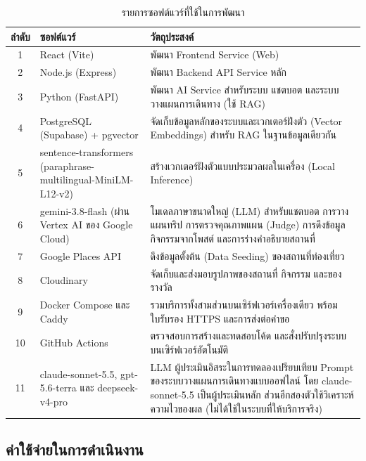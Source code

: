 \begin{table}[H]
\centering
\caption{รายการซอฟต์แวร์ที่ใช้ในการพัฒนา}
\label{tab:software}
\begin{tabular}{|c|p{4.3cm}|p{6.5cm}|}
\hline
\textbf{ลำดับ} & \textbf{ซอฟต์แวร์} & \textbf{วัตถุประสงค์} \\
\hline
1 & React (Vite) & พัฒนา Frontend Service (Web) \\ \hline
2 & Node.js (Express) & พัฒนา Backend API Service หลัก \\ \hline
3 & Python (FastAPI) & พัฒนา AI Service สำหรับระบบ แชตบอต และระบบวางแผนการเดินทาง (ใช้ RAG) \\ \hline
4 & PostgreSQL (Supabase) + pgvector & จัดเก็บข้อมูลหลักของระบบและเวกเตอร์ฝังตัว (Vector Embeddings) สำหรับ RAG ในฐานข้อมูลเดียวกัน \\ \hline
5 & sentence-transformers (paraphrase-multilingual-MiniLM-L12-v2) & สร้างเวกเตอร์ฝังตัวแบบประมวลผลในเครื่อง (Local Inference) \\ \hline
6 & gemini-3.8-flash (ผ่าน Vertex AI ของ Google Cloud) & โมเดลภาษาขนาดใหญ่ (LLM) สำหรับแชตบอต การวางแผนทริป การตรวจคุณภาพแผน (Judge) การดึงข้อมูลกิจกรรมจากโพสต์ และการร่างคำอธิบายสถานที่ \\ \hline
7 & Google Places API & ดึงข้อมูลตั้งต้น (Data Seeding) ของสถานที่ท่องเที่ยว \\ \hline
8 & Cloudinary & จัดเก็บและส่งมอบรูปภาพของสถานที่ กิจกรรม และของรางวัล \\ \hline
9 & Docker Compose และ Caddy & รวมบริการทั้งสามส่วนบนเซิร์ฟเวอร์เครื่องเดียว พร้อมใบรับรอง HTTPS และการส่งต่อคำขอ \\ \hline
10 & GitHub Actions & ตรวจสอบการสร้างและทดสอบโค้ด และสั่งปรับปรุงระบบบนเซิร์ฟเวอร์อัตโนมัติ \\ \hline
11 & claude-sonnet-5.5, gpt-5.6-terra และ deepseek-v4-pro & LLM ผู้ประเมินอิสระในการทดลองเปรียบเทียบ Prompt ของระบบวางแผนการเดินทางแบบออฟไลน์ โดย claude-sonnet-5.5 เป็นผู้ประเมินหลัก ส่วนอีกสองตัวใช้วิเคราะห์ความไวของผล (ไม่ได้ใช้ในระบบที่ให้บริการจริง) \\
\hline
\end{tabular}
\end{table}

\subsection{ค่าใช้จ่ายในการดำเนินงาน}

